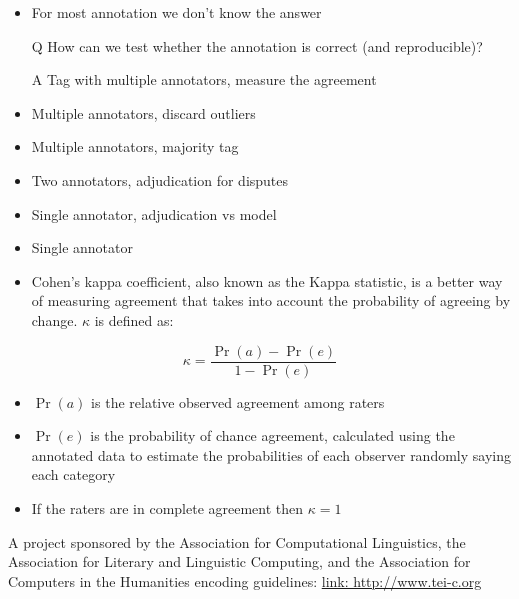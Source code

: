 \documentclass[a4paper,landscape,headrule,footrule,xetex]{foils}
\begin{document}
\begin{itemize}
\item For most annotation we don't know the answer
\item[Q] How can we test whether the annotation is correct (and reproducible)?
\item[A] Tag with multiple annotators, measure the agreement

\end{itemize}


\begin{itemize}
\item Multiple annotators, discard outliers
\item Multiple annotators, majority tag
\item Two annotators, adjudication for disputes
\item Single annotator, adjudication vs model
\item Single annotator
\end{itemize}


\begin{itemize}
\item Cohen's kappa coefficient, also known as the Kappa statistic, is a better way of measuring agreement that takes into account the probability of agreeing by change.  $\kappa$ is defined as:
\end{itemize}
\begin{equation}
  \label{eq:1}
  \kappa = \frac{\Pr(a) - \Pr(e)}{1 - \Pr(e)}
\end{equation}

\begin{itemize}
\item $\Pr(a)$ is the relative observed agreement among raters
\item $\Pr(e)$ is the probability of chance agreement, calculated using
the annotated data to estimate the probabilities of each observer
randomly saying each category
\item If the raters are in complete agreement then $\kappa = 1$
\end{itemize}



A project sponsored by the Association for
Computational Linguistics, the Association for
Literary and Linguistic Computing, and the
Association for Computers in the Humanities
encoding guidelines: \url{link: http://www.tei-c.org}
\end{document}
